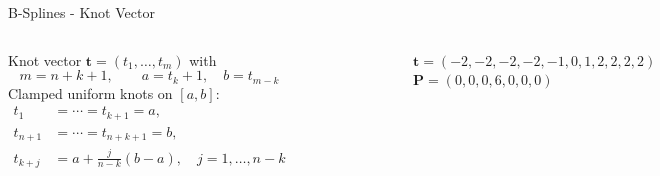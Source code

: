 \documentclass[aspectratio=169]{beamer}
\begin{document}
\begin{frame}{B-Splines - Knot Vector}
	
	\begin{columns}[T,onlytextwidth]
		
		
		Knot vector $\mathbf{t}=(t_1,\dots,t_{m})$ with
		$$m=n+k+1,\qquad a=t_k+1,\quad b=t_{m-k}$$
		Clamped uniform knots on $[a,b]$:
		\begin{align*}
			t_1 &=\cdots=t_{k+1}=a,\\
			t_{n+1} &=\cdots=t_{n+k+1}=b,\\
			t_{k+j} &= a+\frac{j}{n-k}(b-a),\quad j=1,\dots,n-k\\
		\end{align*}
		
		\begin{figure}
			\centering
			\includegraphics[height=0.6\textheight]{../images/Cardinal_cubic_B-spline2.png}
		\end{figure}
		$\mathbf{t}=(-2, -2, -2, -2, -1, 0, 1, 2, 2, 2, 2)$\\
		$\mathbf{P}=(0, 0, 0, 6, 0, 0, 0)$
		
	\end{columns}
	
\end{frame}

\end{document}
